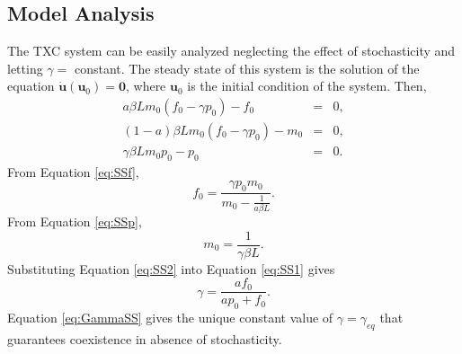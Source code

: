 	\subsection{Model Analysis}
	The TXC system can be easily analyzed neglecting the effect of stochasticity and letting $\gamma = $ constant. The steady state of this system is the solution of the equation $\dot{\textbf{u}}(\textbf{u}_0) = \textbf{0}$, where $\textbf{u}_0$ is the initial condition of the system. Then,
	\begin{eqnarray}
		a \beta{L}{m_0}(f_0-\gamma p_0)- f_0  & = & 0,\label{eq:SSf} \\
		(1-a) \beta{L}{m_0}(f_0-\gamma p_0)- m_0 & = & 0,\nonumber \\
		\gamma\beta{L}m_0 p_0 - p_0 & = & 0. \label{eq:SSp}
	\end{eqnarray}
	From Equation \ref{eq:SSf},
	\begin{equation}\label{eq:SS1}
		f_0 = \frac{\gamma p_0 m_0}{m_0 - \frac{1}{a \beta L}}.		
	\end{equation}
	From Equation \ref{eq:SSp},
	\begin{equation}\label{eq:SS2}
		m_0 = \frac{1}{\gamma \beta L}.		
	\end{equation}
	Substituting Equation \ref{eq:SS2} into Equation \ref{eq:SS1} gives
	\begin{equation}\label{eq:GammaSS}
		\gamma = \frac{a f_0}{a p_0 + f_0}.		
	\end{equation}
	Equation \ref{eq:GammaSS} gives the unique constant value of $\gamma = \gamma_{eq}$ that guarantees coexistence in absence of stochasticity. 
	
